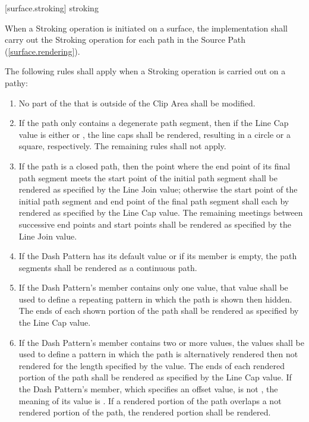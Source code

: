  [surface.stroking] { stroking}

\pnum
When a Stroking operation is initiated on a surface, the implementation shall carry out the Stroking operation for each path in the Source Path (\ref{surface.rendering}).

\pnum
The following rules shall apply when a Stroking operation is carried out on a pathy:
\begin{enumerate}
\item No part of the \underlyingsurface that is outside of the Clip Area shall be modified.

\item If the path only contains a degenerate path segment, then if the Line Cap value is either  or , the line caps shall be rendered, resulting in a circle or a square, respectively. The remaining rules shall not apply.

\item If the path is a closed path, then the point where the end point of its final path segment meets the start point of the initial path segment shall be rendered as specified by the Line Join value; otherwise the start point of the initial path segment and end point of the final path segment shall each by rendered as specified by the Line Cap value. The remaining meetings between successive end points and start points shall be rendered as specified by the Line Join value.

\item If the Dash Pattern has its default value or if its  member is empty, the path segments shall be rendered as a continuous path.

\item If the Dash Pattern's  member contains only one value, that value shall be used to define a repeating pattern in which the path is shown then hidden. The ends of each shown portion of the path shall be rendered as specified by the Line Cap value.

\item If the Dash Pattern's  member contains two or more values, the values shall be used to define a pattern in which the path is alternatively rendered then not rendered for the length specified by the value. The ends of each rendered portion of the path shall be rendered as specified by the Line Cap value. If the Dash Pattern's  member, which specifies an offset value, is not , the meaning of its value is . If a rendered portion of the path overlaps a not rendered portion of the path, the rendered portion shall be rendered.
\end{enumerate}

